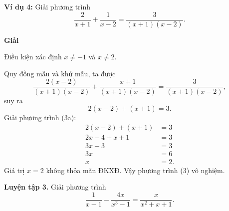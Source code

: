 \begin{lesson}
    \textbf{Ví dụ 4:} Giải phương trình
    \[
        \dfrac{2}{x+1}+\dfrac{1}{x-2}=\dfrac{3}{(x+1)(x-2)}. \tag{3}
    \]

    \textbf{Giải}

    Điều kiện xác định $x\ne-1$ và $x\ne2$.

    Quy đồng mẫu và khử mẫu, ta được
    \[
        \dfrac{2(x-2)}{(x+1)(x-2)}+\dfrac{x+1}{(x+1)(x-2)}
        =\dfrac{3}{(x+1)(x-2)},
    \]
    suy ra
    \[
        2(x-2)+(x+1)=3. \tag{3a}
    \]
    Giải phương trình (3a):
    \[
        \begin{aligned}
            2(x-2)+(x+1)&=3\\
            2x-4+x+1&=3\\
            3x-3&=3\\
            3x&=6\\
            x&=2.
        \end{aligned}
    \]
    Giá trị $x=2$ không thỏa mãn ĐKXĐ. Vậy phương trình (3) vô nghiệm.

    \textbf{Luyện tập 3.} Giải phương trình
    \[
        \dfrac{1}{x-1}-\dfrac{4x}{x^3-1}=\dfrac{x}{x^2+x+1}.
    \]

    \answerline
    \answerline
    \answerline
\end{lesson}

